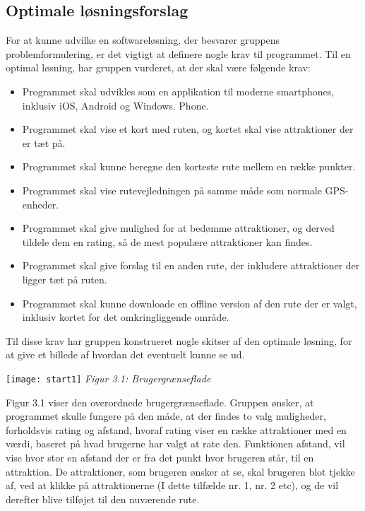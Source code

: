 \subsection{Optimale løsningsforslag}
For at kunne udvilke en softwareløsning, der besvarer gruppens problemformulering, er det vigtigt at definere nogle krav til programmet. Til en optimal løsning, har gruppen vurderet, at der skal være følgende krav:
\begin{itemize}
	\item Programmet skal udvikles som en applikation til moderne smartphones, inklusiv iOS, Android og Windows. Phone. 
	\item Programmet skal vise et kort med ruten, og kortet skal vise attraktioner der er tæt på. 
	\item Programmet skal kunne beregne den korteste rute mellem en række punkter.
	\item Programmet skal vise rutevejledningen på samme måde som normale GPS-enheder. 
	\item Programmet skal give mulighed for at bedømme attraktioner, og derved tildele dem en rating, så de mest populære attraktioner kan findes. 
	\item Programmet skal give forslag til en anden rute, der inkludere attraktioner der ligger tæt på ruten.
	\item Programmet skal kunne  downloade en offline version af den rute der er valgt, inklusiv kortet for det omkringliggende område.
\end{itemize}
Til disse krav har gruppen konstrueret nogle skitser af den optimale løsning, for at give et billede af hvordan det eventuelt kunne se ud. \newline

\texttt{[image: start1]} \newline
\textit{Figur 3.1: Brugergrænseflade}\newline

Figur 3.1 viser den overordnede brugergrænseflade. Gruppen ønsker, at programmet skulle fungere på den måde, at der findes to valg muligheder, forholdsvis rating og afstand, hvoraf rating viser en række attraktioner med en værdi, baseret på hvad brugerne har valgt at rate den. Funktionen afstand, vil vise hvor stor en afstand der er fra det punkt hvor brugeren står, til en attraktion. De attraktioner, som brugeren ønsker at se, skal brugeren blot tjekke af, ved at klikke på attraktionerne (I dette tilfælde nr. 1, nr. 2 etc), og de vil derefter blive tilføjet til den nuværende rute. \newline

